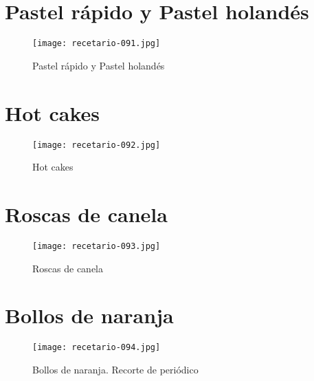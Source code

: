 \documentclass[12pt,letterpaper]{article}
\begin{document}

\newpage

\section{Pastel rápido y Pastel holandés}
  \begin{figure}[H]
    \vspace{2pt}
  \texttt{[image: recetario-091.jpg]}
    \caption{Pastel rápido y Pastel holandés}
    
  \end{figure}

\newpage

\section{Hot cakes}
  \begin{figure}[H]
    \vspace{2pt}
  \texttt{[image: recetario-092.jpg]}
    \caption{Hot cakes}
    
  \end{figure}

\newpage

\section{Roscas de canela}
  \begin{figure}[H]
    \vspace{2pt}
  \texttt{[image: recetario-093.jpg]}
    \caption{Roscas de canela}
    
  \end{figure}

\newpage

\section{Bollos de naranja}
  \begin{figure}[H]
    \vspace{2pt}
  \texttt{[image: recetario-094.jpg]}
    \caption{Bollos de naranja. Recorte de periódico}
    
  \end{figure}

\newpage
\end{document}
